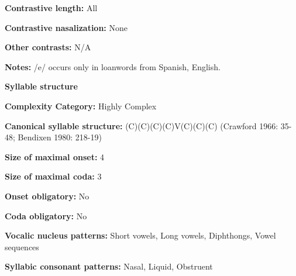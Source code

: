 \begin{styleBody}
\textbf{Contrastive length:} All
\end{styleBody}

\begin{styleBody}
\textbf{Contrastive nasalization:} None
\end{styleBody}

\begin{styleBody}
\textbf{Other contrasts:} N/A
\end{styleBody}

\begin{styleBody}
\textbf{Notes:} /e/ occurs only in loanwords from Spanish, English.
\end{styleBody}

\begin{styleBody}
\textbf{Syllable structure}
\end{styleBody}

\begin{styleBody}
\textbf{Complexity Category:} Highly Complex
\end{styleBody}

\begin{styleBody}
\textbf{Canonical syllable structure:} (C)(C)(C)(C)V(C)(C)(C)\textbf{ }(Crawford 1966: 35-48; Bendixen 1980: 218-19)
\end{styleBody}

\begin{styleBody}
\textbf{Size of maximal onset:} 4
\end{styleBody}

\begin{styleBody}
\textbf{Size of maximal coda:} 3
\end{styleBody}

\begin{styleBody}
\textbf{Onset obligatory:} No
\end{styleBody}

\begin{styleBody}
\textbf{Coda obligatory:} No
\end{styleBody}

\begin{styleBody}
\textbf{Vocalic nucleus patterns:} Short vowels, Long vowels, Diphthongs, Vowel sequences
\end{styleBody}

\begin{styleBody}
\textbf{Syllabic consonant patterns:} Nasal, Liquid, Obstruent
\end{styleBody}

